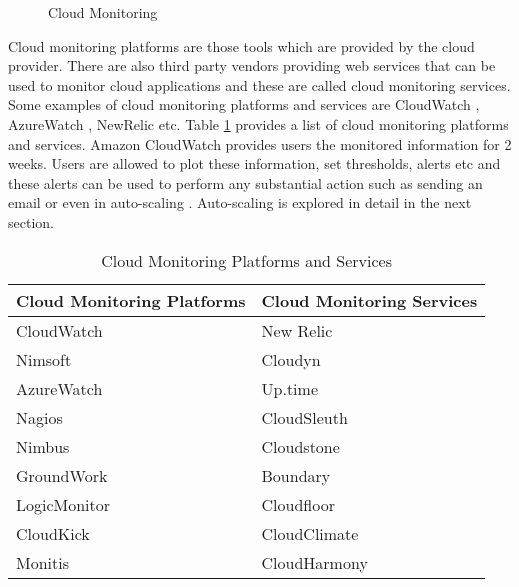 \documentclass[article,type=msc,colorback,12pt,accentcolor=tud8b,table]{tudthesis}
\begin{document}
 	\begin{figure}
 		\begin{center}
 			\makebox[\textwidth]{\texttt{[image: B5]}}
 		\end{center}
 		\caption{Cloud Monitoring \cite{aceto2013cloud}}
 		\label{fig:cloud_monitor}
 	\end{figure}
	
	Cloud monitoring platforms are those tools which are provided by the cloud provider. There are also third party vendors providing web services that can be used to monitor cloud applications and these are called cloud monitoring services. Some examples of cloud monitoring platforms and services are CloudWatch \cite{cloudwatchdev} \cite{cloudwatch}, AzureWatch \cite{azurewatch} , NewRelic \cite{newrelic} etc. Table \ref{tab:Table1} provides a list of cloud monitoring platforms and services. Amazon CloudWatch provides users the monitored information for 2 weeks. Users are allowed to plot these information, set thresholds, alerts etc and these alerts can be used to perform any substantial action such as sending an email or even in auto-scaling \cite{aas}. Auto-scaling is explored in detail in the next section. 
	
\begin{table}[h!]
  \centering
  \caption{Cloud Monitoring Platforms and Services }
  \label{tab:Table1}
  \begin{tabular}{l|l}
  \hline
  \rowcolor[HTML]{FFD27F}  \textbf{Cloud Monitoring Platforms}  & \textbf{Cloud Monitoring Services} \\
    \hline
    CloudWatch \cite{cloudwatchdev} \cite{cloudwatch} & New Relic \cite{newrelic} \\    
    Nimsoft \cite{nimsoft} & Cloudyn \cite{cloudyn} \\        
    AzureWatch \cite{azurewatch} & Up.time \cite{uptime} \\        
    Nagios \cite{nagios} & CloudSleuth \cite{cloudsleuth} \\
    Nimbus \cite{nimbus} & Cloudstone \cite{cloudstone} \\ 
    GroundWork \cite{groundwork} & Boundary \cite{boundary} \\
    LogicMonitor \cite{logicmonitor} & Cloudfloor \cite{cloudfloor} \\ 
    CloudKick \cite{cloudkick} & CloudClimate \cite{cloudclimate} \\    
    Monitis \cite{monitis} & CloudHarmony \cite{cloudharmony} \\
    \hline
    
  \end{tabular}
\end{table}
	
\end{document}
